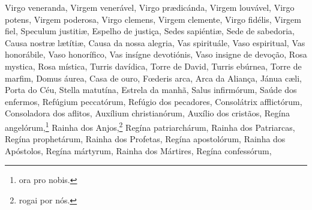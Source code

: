 \begin{paracol}{2}
\switchcolumn*
Virgo veneranda,
\switchcolumn
Virgem venerável,
\switchcolumn*
Virgo prædicánda,
\switchcolumn
Virgem louvável,
\switchcolumn*
Virgo potens,
\switchcolumn
Virgem poderosa,
\switchcolumn*
Virgo clemens,
\switchcolumn
Virgem clemente,
\switchcolumn*
Virgo fidélis,
\switchcolumn
Virgem fiel,
\switchcolumn*
Speculum justitiæ,
\switchcolumn
Espelho de justiça,
\switchcolumn*
Sedes sapiéntiæ,
\switchcolumn
Sede de sabedoria,
\switchcolumn*
Causa nostræ lætítiæ,
\switchcolumn
Causa da nossa alegria,
\switchcolumn*
Vas spirituále,
\switchcolumn
Vaso espiritual,
\switchcolumn*
Vas honorábile,
\switchcolumn
Vaso honorífico,
\switchcolumn*
Vas insígne devotiónis,
\switchcolumn
Vaso insigne de devoção,
\switchcolumn*
Rosa mystica,
\switchcolumn
Rosa mística,
\switchcolumn*
Turris davídica,
\switchcolumn
Torre de David,
\switchcolumn*
Turris ebúrnea,
\switchcolumn
Torre de marfim,
\switchcolumn*
Domus áurea,
\switchcolumn
Casa de ouro,
\switchcolumn*
Fœderis arca,
\switchcolumn
Arca da Aliança,
\switchcolumn*
Jánua cæli,
\switchcolumn
Porta do Céu,
\switchcolumn*
Stella matutína,
\switchcolumn
Estrela da manhã,
\switchcolumn*
Salus infirmórum,
\switchcolumn
Saúde dos enfermos,
\switchcolumn*
Refúgium peccatórum,
\switchcolumn
Refúgio dos pecadores,
\switchcolumn*
Consolátrix afflictórum,
\switchcolumn
Consoladora dos aflitos,
\switchcolumn*
Auxílium christianórum,
\switchcolumn
Auxílio dos cristãos,
\switchcolumn*
Regína angelórum,\footnote[2]{ora pro nobis.\label{ora}}
\switchcolumn
Rainha dos Anjos,\footnote[2]{rogai por nós.\label{rogai}}
\switchcolumn*
Regína patriarchárum,
\switchcolumn
Rainha dos Patriarcas,
\switchcolumn*
Regína prophetárum,
\switchcolumn
Rainha dos Profetas,
\switchcolumn*
Regína apostolórum,
\switchcolumn
Rainha dos Apóstolos,
\switchcolumn*
Regína mártyrum,
\switchcolumn
Rainha dos Mártires,
\switchcolumn*
Regína confessórum,

\end{paracol}
